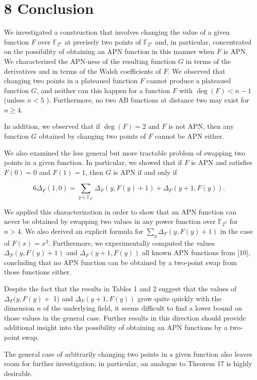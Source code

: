 \documentclass[10pt]{article}
\begin{document}
\section*{8 Conclusion}
We investigated a construction that involves changing the value of a given function $F$ over $\mathbb{F}_{2^{n}}$ at precisely two points of $\mathbb{F}_{2^{n}}$ and, in particular, concentrated on the possibility of obtaining an APN function in this manner when $F$ is APN. We characterized the APN-ness of the resulting function $G$ in terms of the derivatives and in terms of the Walsh coefficients of $F$. We observed that changing two points in a plateaued function $F$ cannot produce a plateaued function $G$, and neither can this happen for a function $F$ with $\operatorname{deg}(F)<n-1$ (unless $n<5$ ). Furthermore, no two AB functions at distance two may exist for $n \geq 4$.

In addition, we observed that if $\operatorname{deg}(F)=2$ and $F$ is not APN, then any function $G$ obtained by changing two points of $F$ cannot be APN either.

We also examined the less general but more tractable problem of swapping two points in a given function. In particular, we showed that if $F$ is APN and satisfies $F(0)=0$ and $F(1)=1$, then $G$ is APN if and only if

$$
6 \Delta_{F}(1,0)=\sum_{y \in \mathbb{F}_{2^{n}}} \Delta_{F}(y, F(y)+1)+\Delta_{F}(y+1, F(y)) .
$$

We applied this characterization in order to show that an APN function can never be obtained by swapping two values in any power function over $\mathbb{F}_{2^{n}}$ for $n>4$. We also derived an explicit formula for $\sum_{y} \Delta_{F}(y, F(y)+1)$ in the case of $F(x)=x^{3}$. Furthermore, we experimentally computed the values $\Delta_{F}(y, F(y)+1)$ and $\Delta_{F}(y+1, F(y))$ all known APN functions from [10], concluding that no APN function can be obtained by a two-point swap from those functions either.

Despite the fact that the results in Tables 1 and 2 suggest that the values of $\Delta_{F}(y, F(y)+$ 1) and $\Delta_{F}(y+1, F(y))$ grow quite quickly with the dimension $n$ of the underlying field, it seems difficult to find a lower bound on those values in the general case. Further results in this direction should provide additional insight into the possibility of obtaining an APN functions by a two-point swap.

The general case of arbitrarily changing two points in a given function also leaves room for further investigation; in particular, an analogue to Theorem 17 is highly desirable.
\end{document}
